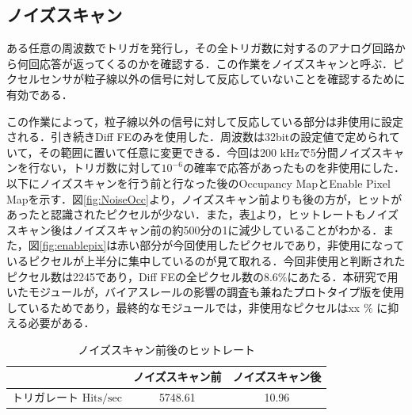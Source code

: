 \subsection{ノイズスキャン}
ある任意の周波数でトリガを発行し，その全トリガ数に対するのアナログ回路から何回応答が返ってくるのかを確認する．この作業をノイズスキャンと呼ぶ．ピクセルセンサが粒子線以外の信号に対して反応していないことを確認するために有効である．\par
この作業によって，粒子線以外の信号に対して反応している部分は非使用に設定される．引き続きDiff FEのみを使用した．周波数は32bitの設定値で定められていて，その範囲に置いて任意に変更できる．今回は200 $\mathrm{kHz}$で5分間ノイズスキャンを行ない，トリガ数に対して$10^{-6}$の確率で応答があったものを非使用にした．以下にノイズスキャンを行う前と行なった後のOccupancy MapとEnable Pixel Mapを示す．図\ref{fig:NoiseOcc}より，ノイズスキャン前よりも後の方が，ヒットがあったと認識されたピクセルが少ない．また，表\ref{tab:noisehitrate}より，ヒットレートもノイズスキャン後はノイズスキャン前の約500分の1に減少していることがわかる．また，図\ref{fig:enablepix}は赤い部分が今回使用したピクセルであり，非使用になっているピクセルが上半分に集中しているのが見て取れる．今回非使用と判断されたピクセル数は2245であり，Diff FEの全ピクセル数の8.6\%にあたる．本研究で用いたモジュールが，バイアスレールの影響の調査も兼ねたプロトタイプ版を使用しているためであり，最終的なモジュールでは，非使用なピクセルはxx $\mathrm{\%}$ \cite{ATLCOMIT61:online}に抑える必要がある．

%


\begin{table}[h]
  \centering
  \caption{ノイズスキャン前後のヒットレート}
  \begin{tabular} {l|cc} \hline
     & ノイズスキャン前 & ノイズスキャン後 \\ \hline \hline
    トリガレート $\mathrm{Hits/sec}$ & 5748.61 & 10.96 \\ \hline
  \end{tabular}
  \label{tab:noisehitrate}
\end{table}

